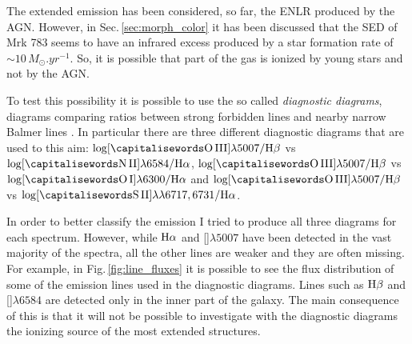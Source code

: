 \documentclass[../main.tex]{subfiles}
\begin{document}
The extended emission has been considered, so far, the ENLR produced by the AGN.
However, in Sec.\,\ref{sec:morph_color} it has been discussed that the SED of Mrk 783 seems to have an infrared excess produced by a star formation rate of $\sim 10\,\si{M_{\odot}.yr^{-1}}$.
So, it is possible that part of the gas is ionized by young stars and not by the AGN.

To test this possibility it is possible to use the so called \emph{diagnostic diagrams}, diagrams comparing ratios between strong forbidden lines and nearby narrow Balmer lines \citep{Baldwin81,Veilleux87}.
In particular there are three different diagnostic diagrams that are used to this aim: $\log [\rm \ion{O}{III}]\lambda5007/\Hb$ vs $\log [\rm \ion{N}{II}]\lambda6584/\Ha$, $\log [\rm \ion{O}{III}]\lambda5007/\Hb$ vs $\log [\rm \ion{O}{I}]\lambda6300/\Ha$ and $\log [\rm \ion{O}{III}]\lambda5007/\Hb$ vs $\log [\rm \ion{S}{II}]\lambda\lambda6717,6731/\Ha$.

In order to better classify the emission I tried to produce all three diagrams for each spectrum.
However, while $\rm H\alpha$ and []$\lambda5007$ have been detected in the vast majority of the spectra, all the other lines are weaker and they are often missing.
For example, in Fig.\,\ref{fig:line_fluxes} it is possible to see the flux distribution of some of the emission lines used in the diagnostic diagrams.
Lines such as $\rm H\beta$ and []$\lambda6584$ are detected only in the inner part of the galaxy.
The main consequence of this is that it will not be possible to investigate with the diagnostic diagrams the ionizing source of the most extended structures.
\end{document}
